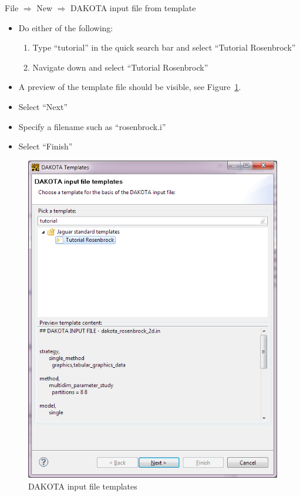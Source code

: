File $\Rightarrow$ New $\Rightarrow$ DAKOTA input file from template
\begin{itemize}
\item Do either of the following:
\begin{enumerate}
\item Type ``tutorial'' in the quick search bar and select ``Tutorial Rosenbrock''
\item Navigate down and select ``Tutorial Rosenbrock''
\end{enumerate}
\item A preview of the template file should be visible, see Figure~\ref{fig:input:1tutorial}.
\item Select ``Next''
\item Specify a filename such as ``rosenbrock.i''
\item Select ``Finish''
\end{itemize}
\begin{figure}[htbp]
  \centering
  \includegraphics[scale=0.6]{images/1tutorial}
  \caption{DAKOTA input file templates}
  \label{fig:input:1tutorial}
\end{figure}


